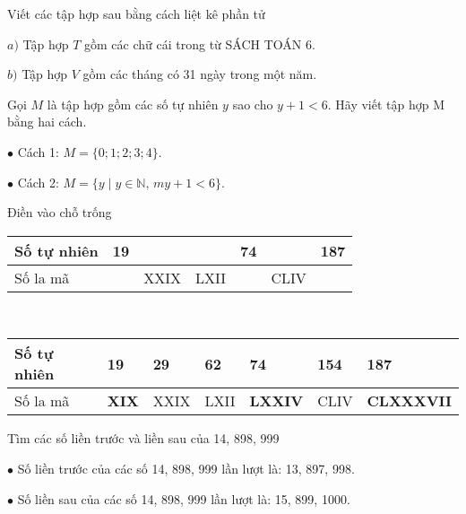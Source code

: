 \begin{bt}
	Viết các tập hợp sau bằng cách liệt kê phần tử
	
	$a)$ Tập hợp $T$ gồm các chữ cái trong từ SÁCH TOÁN 6.
	
	$b)$ Tập hợp $V$ gồm các tháng có 31 ngày trong một năm.
\end{bt}
\begin{bt}
	Gọi $M$ là tập hợp gồm các số tự nhiên $y$ sao cho $y+1<6$. Hãy viết tập hợp M bằng hai cách.
	\begin{loigiaichuong1}
		$\bullet$	Cách 1: $M = \{0; 1; 2; 3; 4\}$.
		
		$\bullet$	Cách 2: $M = \{ y \mid y \in \mathbb{N},\, m y + 1 < 6\}$.
	\end{loigiaichuong1}
\end{bt}
\begin{bt}
	Điền vào chỗ trống
	\begin{center}
		\renewcommand{\arraystretch}{1.1}
		\begin{tabularx}{\textwidth}{|p{2cm}|*{6}{Y|} }
			\hline
			Số tự nhiên&	19&	&	&	74&	&	187\\
			\hline
			Số la mã&	&	XXIX&	LXII&	&	CLIV&	\\
			\hline
		\end{tabularx}
	\end{center}
	\begin{loigiaichuong1}
		\,\\
			\renewcommand{\arraystretch}{1.1}
			\begin{tabularx}{\textwidth}{|p{2cm}|*{6}{Y|} }
				\hline
				Số tự nhiên&	19&	\textbf{29} & \textbf{62}	&	74&	\textbf{154}&	187\\
				\hline
				Số la mã&	\textbf{XIX}&	XXIX&	LXII&	\textbf{LXXIV}&	CLIV&	\textbf{CLXXXVII}\\
				\hline
			\end{tabularx}
	\end{loigiaichuong1}	
\end{bt}
\begin{bt}
	Tìm các số liền trước và liền sau của 14, 898, 999
	\begin{loigiaichuong1}
		$\bullet$	Số liền trước của các số 14, 898, 999 lần lượt là: 13, 897, 998.
		
		$\bullet$	Số liền sau của các số 14, 898, 999 lần lượt là: 15, 899, 1000.
	\end{loigiaichuong1}
\end{bt} 
